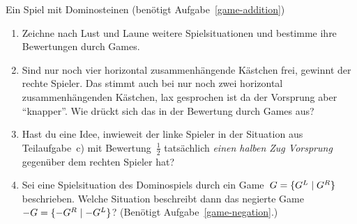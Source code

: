 \documentclass{../zirkelblatt}
\begin{document}
\begin{aufgabe}{Ein Spiel mit Dominosteinen (benötigt Aufgabe~\ref{game-addition})}
\begin{enumerate}
von Teilaufgabe~c) sofort das Game zu folgender Situation anzugeben. Welcher
Spieler besitzt eine Gewinnstrategie?
\[
  \begin{Young}
    \cr
    \cr
    &\cr
  \end{Young}
  \begin{array}{@{}c@{}}\begin{Young}
    &&&\cr
  \end{Young}\\[7.2em]\end{array}
  \hspace{-3.7em}
  \begin{Young}
    \cr
    \cr
  \end{Young}
\]
\vspace{-5em}
\item Zeichne nach Lust und Laune weitere Spielsituationen und bestimme ihre
Bewertungen durch Games.
\item Sind nur noch vier horizontal zusammenhängende Kästchen frei, gewinnt der
rechte Spieler. Das stimmt auch bei nur noch zwei horizontal zusammenhängenden
Kästchen, lax gesprochen ist da der Vorsprung aber "`knapper"'. Wie drückt
sich das in der Bewertung durch Games aus?
\item Hast du eine Idee, inwieweit der linke Spieler in der Situation aus Teilaufgabe~c) mit
Bewertung~$\tfrac{1}{2}$ tatsächlich \emph{einen halben Zug Vorsprung}
gegenüber dem rechten Spieler hat?
\item Sei eine Spielsituation des Dominospiels durch ein Game~$G =
\{ G^L \mathrel{|} G^R \}$ beschrieben.
Welche Situation beschreibt dann das negierte Game~$-G = \{ -G^R \mathrel{|} -G^L \}$?
(Benötigt Aufgabe~\ref{game-negation}.)
\end{enumerate}
\end{aufgabe}
\end{document}
